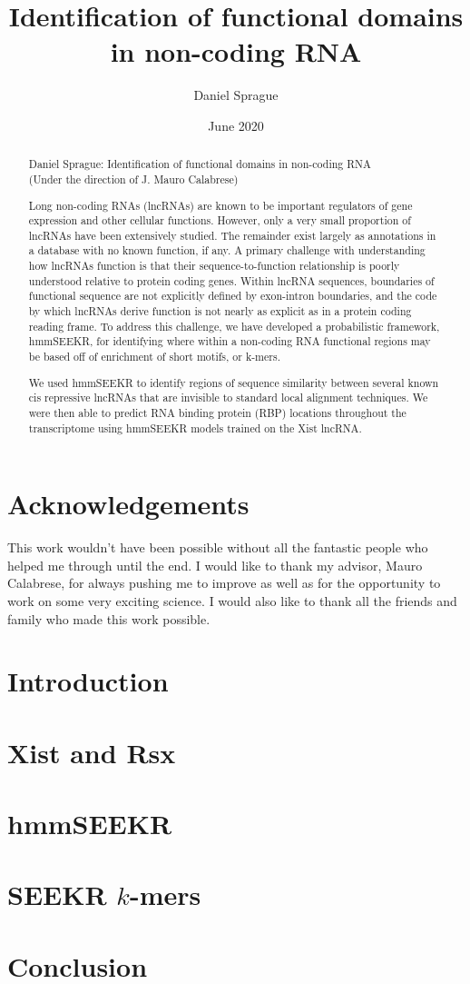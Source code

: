 \documentclass[12pt,left=1in,right=1in,top=1in,bottom=1in]{report}
\title{
    {Identification of functional domains \linebreak in non-coding RNA}\\
    }
\author{Daniel Sprague}
\date{June 2020}
\def\frontmatter{%
    \pagenumbering{roman}
    \setcounter{page}{1}
    \renewcommand{\thesection}{\Roman{section}}
}%
\def\mainmatter{%
    \pagenumbering{arabic}
    \setcounter{page}{1}
    \setcounter{section}{0}
    \renewcommand{\thesection}{\arabic{section}}
}%
\begin{document}
\frontmatter

\maketitle
\begin{abstract}
\begin{center}
Daniel Sprague: Identification of functional domains in non-coding RNA\\
(Under the direction of J. Mauro Calabrese)
\end{center}
Long non-coding RNAs (lncRNAs) are known to be important regulators of gene expression and other cellular functions. However, only a very small proportion of lncRNAs have been extensively studied. The remainder exist largely as annotations in a database with no known function, if any. A primary challenge with understanding how lncRNAs function is that their sequence-to-function relationship is poorly understood relative to protein coding genes. Within lncRNA sequences, boundaries of functional sequence are not explicitly defined by exon-intron boundaries, and the code by which lncRNAs derive function is not nearly as explicit as in a protein coding reading frame. To address this challenge, we have developed a probabilistic framework, hmmSEEKR, for identifying where within a non-coding RNA functional regions may be based off of enrichment of short motifs, or k-mers. 

We used hmmSEEKR to identify regions of sequence similarity between several known cis repressive lncRNAs that are invisible to standard local alignment techniques. We were then able to predict RNA binding protein (RBP) locations throughout the transcriptome using hmmSEEKR models trained on the Xist lncRNA.
\end{abstract}
\chapter*{\center Acknowledgements}
\begin{center}
This work wouldn't have been possible without all the fantastic people who helped me through until the end. I would like to thank my advisor, Mauro Calabrese, for always pushing me to improve as well as for the opportunity to work on some very exciting science. I would also like to thank all the friends and family who made this work possible. 
\end{center}
\tableofcontents
\listoffigures
\listoftables

\mainmatter

\chapter{Introduction}

\chapter{Xist and Rsx}

\chapter{hmmSEEKR}

\chapter{SEEKR $k$-mers}

\chapter{Conclusion}

\end{document}

